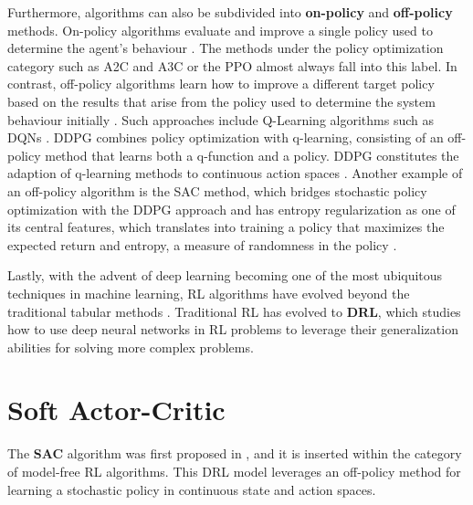 Furthermore, algorithms can also be subdivided into \textbf{on-policy} and \textbf{off-policy} methods. \cite{moralesGrokkingDeepReinforcement2020} On-policy algorithms evaluate and improve a single policy used to determine the agent's behaviour \cite{moralesGrokkingDeepReinforcement2020}. The methods under the policy optimization category such as A2C and A3C \cite{mnihAsynchronousMethodsDeep2016} or the \ac{PPO} \cite{schulmanProximalPolicyOptimization2017} almost always fall into this label. In contrast, off-policy algorithms learn how to improve a different target policy based on the results that arise from the policy used to determine the system behaviour initially \cite{moralesGrokkingDeepReinforcement2020}. Such approaches include Q-Learning algorithms such as \acp{DQN} \cite{mnihHumanlevelControlDeep2015, openaiSpinningDocumentation}. \ac{DDPG} \cite{lillicrapContinuousControlDeep2019} combines policy optimization with q-learning, consisting of an off-policy method that learns both a q-function and a policy. \ac{DDPG} constitutes the adaption of q-learning methods to continuous action spaces \cite{openaiSpinningDocumentation}. Another example of an off-policy algorithm is the \ac{SAC} \cite{haarnojaSoftActorCriticOffPolicy2018} method, which bridges stochastic policy optimization with the \ac{DDPG} approach and has entropy regularization as one of its central features, which translates into training a policy that maximizes the expected return and entropy, a measure of randomness in the policy \cite{openaiSpinningDocumentation}. \par
Lastly, with the advent of deep learning becoming one of the most ubiquitous techniques in machine learning, \ac{RL} algorithms have evolved beyond the traditional tabular methods \cite{moralesGrokkingDeepReinforcement2020}. Traditional \ac{RL} has evolved to \textbf{\acf{DRL}}, which studies how to use deep neural networks in \ac{RL} problems to leverage their generalization abilities for solving more complex problems.

\section{Soft Actor-Critic}

The \textbf{\acf{SAC}} algorithm was first proposed in \cite{haarnojaSoftActorCriticOffPolicy2018}, and it is inserted within the category of model-free \acf{RL} algorithms. This \acf{DRL} model leverages an off-policy method for learning a stochastic policy in continuous state and action spaces. 

